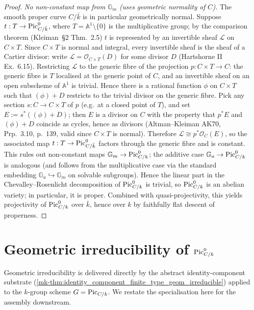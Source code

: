 \begin{proof}
  \emph{No non-constant map from \(\mathbb{G}_m\) (uses geometric
  normality of \(C\)).} The smooth proper curve \(C/\bar k\) is
  in particular geometrically normal. Suppose
  \(t : T \to \operatorname{Pic}^0_{C/\bar k}\), where \(T = \mathbb{A}^1
  \setminus \{0\}\) is the multiplicative group; by the comparison
  theorem (Kleiman~\S 2 Thm.~2.5) \(t\) is represented by an
  invertible sheaf \(\mathcal{L}\) on \(C \times T\). Since
  \(C \times T\) is normal and integral, every invertible sheaf is the
  sheaf of a Cartier divisor: write
  \(\mathcal{L} = \mathcal{O}_{C \times T}(D)\) for some divisor \(D\)
  (Hartshorne II Ex.~6.15). Restricting \(\mathcal{L}\) to the generic
  fibre of the projection \(p : C \times T \to C\): the generic fibre
  is \(T\) localised at the generic point of \(C\), and an invertible
  sheaf on an open subscheme of \(\mathbb{A}^1\) is trivial. Hence
  there is a rational function \(\phi\) on \(C \times T\) such that
  \((\phi) + D\) restricts to the trivial divisor on the generic
  fibre. Pick any section \(s : C \to C \times T\) of \(p\) (e.g.\ at
  a closed point of \(T\)), and set \(E := s^*((\phi) + D)\); then
  \(E\) is a divisor on \(C\) with the property that \(p^* E\) and
  \((\phi) + D\) coincide as cycles, hence as divisors (Altman--Kleiman
  AK70, Prp.~3.10, p.~139, valid since \(C \times T\) is normal).
  Therefore \(\mathcal{L} \cong p^* \mathcal{O}_C(E)\), so the
  associated map \(t : T \to \operatorname{Pic}^0_{C/\bar k}\) factors through the
  generic fibre and is constant. This rules out non-constant maps
  \(\mathbb{G}_m \to \operatorname{Pic}^0_{C/k}\); the additive case
  \(\mathbb{G}_a \to \operatorname{Pic}^0_{C/k}\) is analogous (and follows from the
  multiplicative case via the standard embedding
  \(\mathbb{G}_a \hookrightarrow \mathbb{G}_m\) on solvable
  subgroups). Hence the linear part in the Chevalley--Rosenlicht
  decomposition of \(\operatorname{Pic}^0_{C/k}\) is trivial, so \(\operatorname{Pic}^0_{C/k}\) is
  an abelian variety; in particular, it is proper. Combined with
  quasi-projectivity, this yields projectivity of \(\operatorname{Pic}^0_{C/k}\)
  over \(\bar k\), hence over \(k\) by faithfully flat descent of
  properness.
\end{proof}

\section{Geometric irreducibility of \(\operatorname{Pic}^0_{C/k}\)}
\label{mk-sec:pic0_geom_irred}

Geometric irreducibility is delivered directly by the abstract
identity-component substrate
(\ref{mk-thm:identity_component_finite_type_geom_irreducible}) applied
to the \(k\)-group scheme \(G = \operatorname{Pic}_{C/k}\). We restate the
specialisation here for the assembly downstream.

